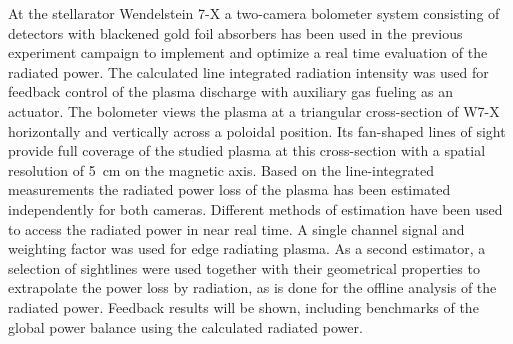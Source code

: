\documentclass{scdpg}
\begin{document}
%
\begin{scAbstract}
%
%
%
%
%
\scBeginText
%
At the stellarator Wendelstein 7-X a two-camera bolometer system consisting of detectors with blackened gold foil absorbers has been used in the previous experiment campaign to implement and optimize a real time evaluation of the radiated power. The calculated line integrated radiation intensity was used for feedback control of the plasma discharge with auxiliary gas fueling as an actuator. The bolometer views the plasma at a triangular cross-section of W7-X horizontally and vertically across a poloidal position. Its fan-shaped lines of sight provide full coverage of the studied plasma at this cross-section with a spatial resolution of \SI{5}{\centi\meter} on the magnetic axis. Based on the line-integrated measurements the radiated power loss of the plasma has been estimated independently for both cameras. Different methods of estimation have been used to access the radiated power in near real time. A single channel signal and weighting factor was used for edge radiating plasma. As a second estimator, a selection of sightlines were used together with their geometrical properties to extrapolate the power loss by radiation, as is done for the offline analysis of the radiated power. Feedback results will be shown, including benchmarks of the global power balance using the calculated radiated power.
%

\end{scAbstract}
\end{document}
